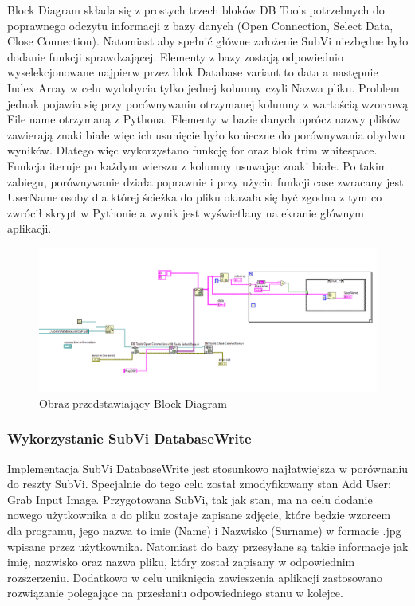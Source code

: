 \documentclass{report}
\begin{document}
Block Diagram składa się z prostych trzech bloków DB Tools potrzebnych do poprawnego odczytu informacji z bazy danych (Open Connection, Select Data, Close Connection).
Natomiast aby spełnić główne założenie SubVi niezbędne było dodanie funkcji sprawdzającej.
Elementy z bazy zostają odpowiednio wyselekcjonowane najpierw przez blok Database variant to data a następnie Index Array w celu wydobycia tylko jednej kolumny czyli Nazwa pliku.
Problem jednak pojawia się przy porównywaniu otrzymanej kolumny z wartością wzorcową File name otrzymaną z Pythona. Elementy w bazie danych oprócz nazwy plików zawierają znaki białe więc ich
usunięcie było konieczne do porównywania obydwu wyników. Dlatego więc wykorzystano funkcję for oraz blok trim whitespace. Funkcja iteruje po każdym wierszu z kolumny usuwając znaki białe.
Po takim zabiegu, porównywanie działa poprawnie i przy użyciu funkcji case zwracany jest UserName osoby dla której ścieżka do pliku okazała się być zgodna z tym co zwrócił skrypt w Pythonie a
wynik jest wyświetlany na ekranie głównym aplikacji.

\begin{figure}[H]
    \centering
    \includegraphics[width=1.0\textwidth]{src/Database/Database_read_subvi.png}
    \caption{Obraz przedstawiający Block Diagram }
    \label{fig:first-att}
\end{figure}

\subsubsection{\large Wykorzystanie SubVi DatabaseWrite}

Implementacja SubVi DatabaseWrite jest stosunkowo najłatwiejsza w porównaniu do reszty SubVi. Specjalnie do tego celu został zmodyfikowany stan Add User: Grab Input Image.
Przygotowana SubVi, tak jak stan, ma na celu dodanie nowego użytkownika a do pliku zostaje zapisane zdjęcie, które będzie wzorcem dla programu, jego nazwa to imie (Name) i Nazwisko (Surname) w formacie .jpg
wpisane przez użytkownika. Natomiast do bazy przesyłane są takie informacje jak imię, nazwisko oraz nazwa pliku, który został zapisany w odpowiednim rozszerzeniu.
Dodatkowo w celu uniknięcia zawieszenia aplikacji zastosowano rozwiązanie polegające na przesłaniu odpowiedniego stanu w kolejce. 
\end{document}
